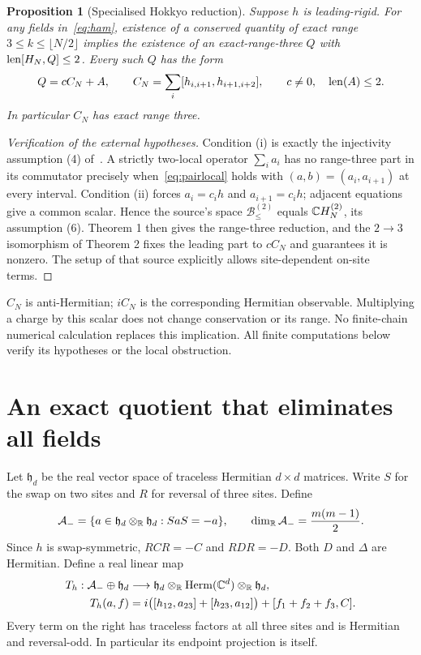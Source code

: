 \documentclass[11pt,a4paper]{article}
\numberwithin{equation}{section}
\newtheorem{proposition}[theorem]{Proposition}
\theoremstyle{definition}\newtheorem{definition}[theorem]{Definition}
\theoremstyle{remark}\newtheorem{remark}[theorem]{Remark}
\begin{document}
\begin{proposition}[Specialised Hokkyo reduction]\label{prop:reduction}
Suppose $h$ is leading-rigid. For any fields in~\eqref{eq:ham}, existence of a conserved quantity of exact range $3\le k\le\lfloor N/2\rfloor$ implies the existence of an exact-range-three $Q$ with $\operatorname{len}[H_N,Q]\le2$. Every such $Q$ has the form
\begin{equation}\label{eq:Qform}
 Q=c C_N+A,\qquad
 C_N=\sum_i[h_{i,i+1},h_{i+1,i+2}],\qquad
 c\ne0,\quad \operatorname{len}(A)\le2.
\end{equation}
In particular $C_N$ has exact range three.
\end{proposition}
\begin{proof}[Verification of the external hypotheses]
Condition (i) is exactly the injectivity assumption (4) of~\cite{HokkyoTest}. A strictly two-local operator $\sum_i a_i$ has no range-three part in its commutator precisely when~\eqref{eq:pairlocal} holds with $(a,b)=(a_i,a_{i+1})$ at every interval. Condition (ii) forces $a_i=c_i h$ and $a_{i+1}=c_i h$; adjacent equations give a common scalar. Hence the source's space $\mathcal B_{\le}^{(2)}$ equals $\mathbb C H_N^{(2)}$, its assumption (6). Theorem 1 then gives the range-three reduction, and the $2\to3$ isomorphism of Theorem 2 fixes the leading part to $cC_N$ and guarantees it is nonzero. The setup of that source explicitly allows site-dependent on-site terms.
\end{proof}

$C_N$ is anti-Hermitian; $iC_N$ is the corresponding Hermitian observable. Multiplying a charge by this scalar does not change conservation or its range. No finite-chain numerical calculation replaces this implication. All finite computations below verify its hypotheses or the local obstruction.

\section{An exact quotient that eliminates all fields}\label{sec:quotient}

Let $\mathfrak h_d$ be the real vector space of traceless Hermitian $d\times d$ matrices. Write $S$ for the swap on two sites and $R$ for reversal of three sites. Define
\[
 \mathcal A_-=
 \{a\in\mathfrak h_d\otimes_{\mathbb R}\mathfrak h_d:SaS=-a\},
 \qquad \dim_{\mathbb R}\mathcal A_-=\frac{m(m-1)}{2}.
\]
Since $h$ is swap-symmetric, $RCR=-C$ and $RDR=-D$. Both $D$ and $\Delta$ are Hermitian. Define a real linear map
\begin{equation}\label{eq:T}
 \begin{split}
 T_h:\mathcal A_-\oplus\mathfrak h_d&\longrightarrow
 \mathfrak h_d\otimes_{\mathbb R}\operatorname{Herm}(\mathbb C^d)\otimes_{\mathbb R}\mathfrak h_d,\\
 T_h(a,f)&=i\bigl([h_{12},a_{23}]+[h_{23},a_{12}]\bigr)
       +[f_1+f_2+f_3,C].
 \end{split}
\end{equation}
Every term on the right has traceless factors at all three sites and is Hermitian and reversal-odd. In particular its endpoint projection is itself.
\end{document}
